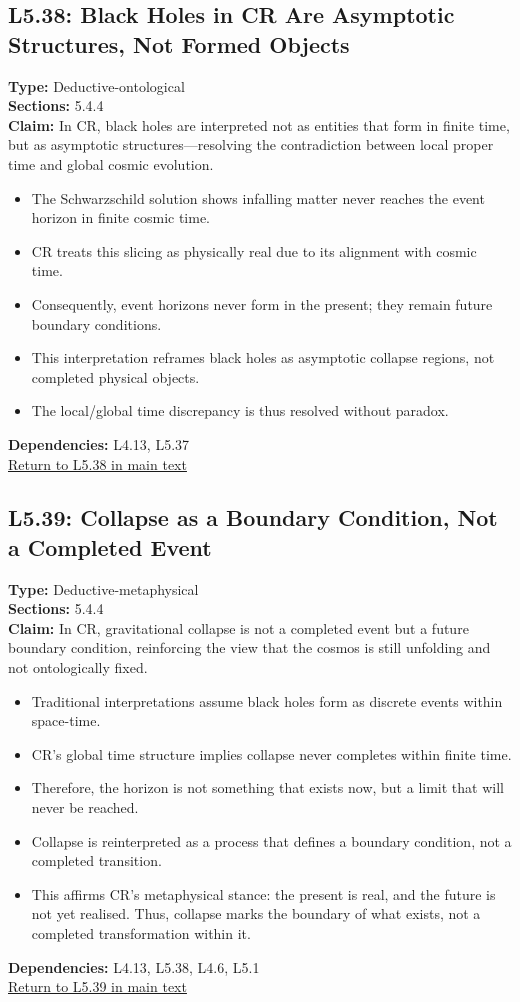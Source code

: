 \documentclass[12pt]{book}
\newcommand{\returnlink}[1]{\hyperref[logic:#1]{Return to #1 in main text}\xspace}
\begin{document}
\subsection*{L5.38: Black Holes in CR Are Asymptotic Structures, Not Formed Objects}
\label{appendix:L5.38}
\textbf{Type:} Deductive-ontological \\
\textbf{Sections:} 5.4.4 \\
\textbf{Claim:} In CR, black holes are interpreted not as entities that form in finite time, but as asymptotic structures---resolving the contradiction between local proper time and global cosmic evolution.
\begin{itemize}
  \item The Schwarzschild solution shows infalling matter never reaches the event horizon in finite cosmic time.
  \item CR treats this slicing as physically real due to its alignment with cosmic time.
  \item Consequently, event horizons never form in the present; they remain future boundary conditions.
  \item This interpretation reframes black holes as asymptotic collapse regions, not completed physical objects.
  \item The local/global time discrepancy is thus resolved without paradox.
\end{itemize}
\textbf{Dependencies:} L4.13, L5.37 \\
\returnlink{L5.38}

\subsection*{L5.39: Collapse as a Boundary Condition, Not a Completed Event}
\label{appendix:L5.39}
\textbf{Type:} Deductive-metaphysical \\
\textbf{Sections:} 5.4.4 \\
\textbf{Claim:} In CR, gravitational collapse is not a completed event but a future boundary condition, reinforcing the view that the cosmos is still unfolding and not ontologically fixed.
\begin{itemize}
  \item Traditional interpretations assume black holes form as discrete events within space-time.
  \item CR's global time structure implies collapse never completes within finite time.
  \item Therefore, the horizon is not something that exists now, but a limit that will never be reached.
  \item Collapse is reinterpreted as a process that defines a boundary condition, not a completed transition.
  \item This affirms CR's metaphysical stance: the present is real, and the future is not yet realised. Thus, collapse marks the boundary of what exists, not a completed transformation within it.
\end{itemize}
\textbf{Dependencies:} L4.13, L5.38, L4.6, L5.1 \\
\returnlink{L5.39}
\end{document}
